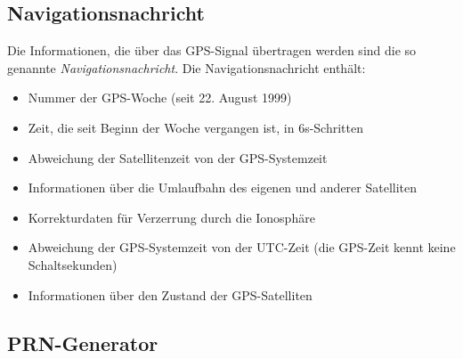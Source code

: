 \documentclass[12pt,a4paper]{scrartcl}
\begin{document}
\subsection{Navigationsnachricht}
Die Informationen, die über das GPS-Signal übertragen werden sind die so genannte \emph{Navigationsnachricht}. Die Navigationsnachricht enthält:
\begin{itemize}
\item Nummer der GPS-Woche (seit 22. August 1999)
\item Zeit, die seit Beginn der Woche vergangen ist, in 6s-Schritten
\item Abweichung der Satellitenzeit von der GPS-Systemzeit
\item Informationen über die Umlaufbahn des eigenen und anderer Satelliten
\item Korrekturdaten für Verzerrung durch die Ionosphäre
\item Abweichung der GPS-Systemzeit von der UTC-Zeit (die GPS-Zeit kennt keine Schaltsekunden)
\item Informationen über den Zustand der GPS-Satelliten
\end{itemize}
\cite{infotip_gps}

\newpage
\printbibliography
\newpage

\begin{appendix}
\section{PRN-Generator}
\end{appendix}
\end{document}
